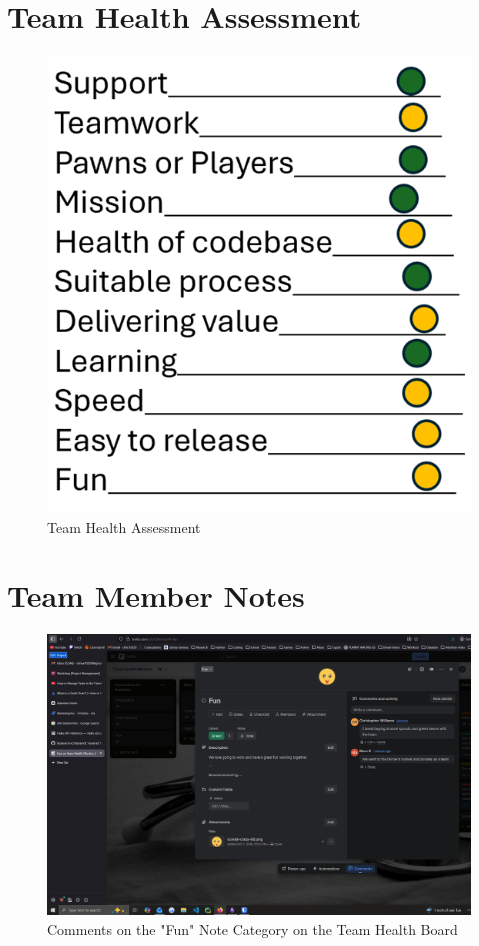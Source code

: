 \documentclass[12pt]{article}
\begin{document}
\section{Team Health Assessment}

\begin{figure}[H]
    \centering
    \includegraphics[width=0.75\linewidth]{images/team_health_assessment_q6.png}
    \caption{Team Health Assessment}\label{fig:q6}
\end{figure}

\section{Team Member Notes}

\begin{figure}[H]
    \centering
    \includegraphics[width=0.75\linewidth]{images/trello_note_q7.png}
    \caption{Comments on the "Fun" Note Category on the Team Health Board}\label{fig:q7}
\end{figure}
\end{document}

